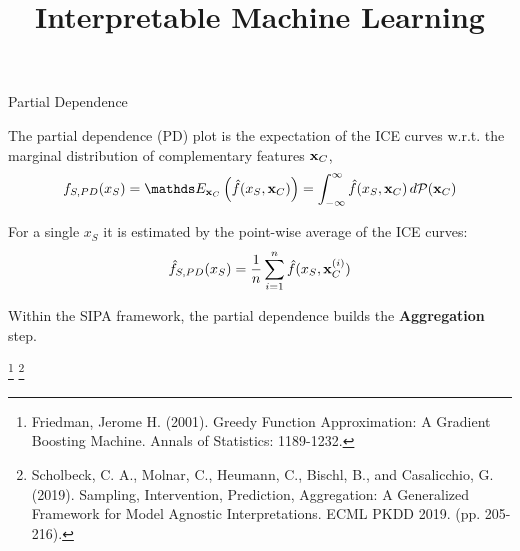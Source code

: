 \documentclass[11pt,compress,t,notes=noshow, xcolor=table]{beamer}
\title{Interpretable Machine Learning}
\institute{\href{https://compstat-lmu.github.io/lecture_iml/}{compstat-lmu.github.io/lecture\_iml}}
\date{}
\begin{document}





\begin{vbframe}{Partial Dependence}

The partial dependence (PD) plot is the expectation of the ICE curves w.r.t. the marginal distribution of complementary features $\xv_C$,
$$f_{S, PD}(x_S) = \E_{\xv_C} \left( \fh(x_S, \xv_C) \right) = \int_{-\infty}^{\infty} \fh(x_S, \xv_C) \, d\mathcal{P}(\xv_C)$$

For a single $x_S$ it is estimated by the point-wise average of the ICE curves:
$$\fh_{S, PD}(x_S) = \frac{1}{n} \sum_{i=1}^n \fh(x_S, \xv_C^{(i)})$$

Within the SIPA framework, the partial dependence builds the \textbf{Aggregation} step.

\footnote[frame]{Friedman, Jerome H. (2001). Greedy Function Approximation: A Gradient Boosting Machine. Annals of Statistics: 1189-1232.}
\footnote[frame]{Scholbeck, C. A., Molnar, C., Heumann, C., Bischl, B., and Casalicchio, G. (2019). Sampling, Intervention, Prediction, Aggregation: A Generalized Framework for Model Agnostic Interpretations. ECML PKDD 2019. (pp. 205-216).}
\end{vbframe}
\end{document}
